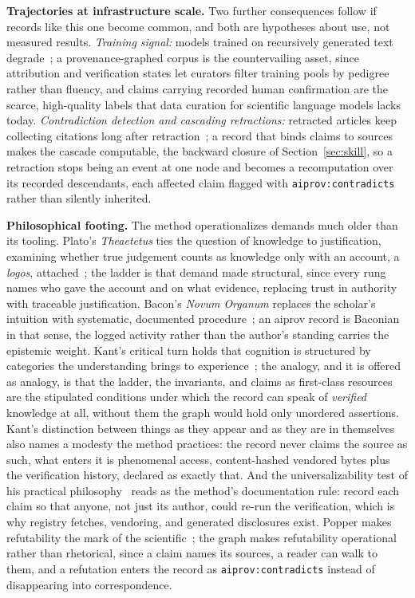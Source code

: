 \textbf{Trajectories at infrastructure scale.} Two further consequences follow if
records like this one become common, and both are hypotheses about
use, not measured results. \emph{Training signal:} models trained on
recursively generated text degrade~\cite{model-collapse2024}; a
provenance-graphed corpus is the countervailing asset, since
attribution and verification states let curators filter training
pools by pedigree rather than fluency, and claims carrying recorded
human confirmation are the scarce, high-quality labels
that data curation for scientific language models lacks today.
\emph{Contradiction detection and cascading retractions:} retracted
articles keep collecting citations long after
retraction~\cite{retracted-citations2022}; a record that binds
claims to sources makes the cascade computable, the backward closure
of Section~\ref{sec:skill}, so a retraction stops being an event at
one node and becomes a recomputation over its recorded descendants,
each affected claim flagged with \texttt{aiprov:contradicts} rather
than silently inherited.

\textbf{Philosophical footing.} The method operationalizes demands
much older than its tooling. Plato's \emph{Theaetetus} ties the
question of knowledge to justification, examining whether true
judgement counts as knowledge only with an account, a \emph{logos},
attached~\cite{plato-theaetetus}; the ladder is that demand made
structural, since every rung names who gave the account and on what
evidence, replacing trust in authority with traceable justification.
Bacon's \emph{Novum Organum} replaces the scholar's intuition with
systematic, documented procedure~\cite{bacon1620}; an aiprov record
is Baconian in that sense, the logged activity rather than
the author's standing carries the epistemic weight. Kant's critical
turn holds that cognition is structured by categories the
understanding brings to experience~\cite{kant-krv}; the analogy, and
it is offered as analogy, is that the ladder, the invariants, and
claims as first-class resources are the stipulated conditions under
which the record can speak of \emph{verified} knowledge at all,
without them the graph would hold only unordered assertions. Kant's
distinction between things as they appear and as they are in
themselves also names a modesty the method practices: the record
never claims the source as such, what enters it is phenomenal
access, content-hashed vendored bytes plus the verification history,
declared as exactly that. And the universalizability test of his
practical philosophy~\cite{kant-groundwork} reads as the method's
documentation rule: record each claim so that anyone, not just its
author, could re-run the verification, which is why registry
fetches, vendoring, and generated disclosures exist. Popper makes
refutability the mark of the scientific~\cite{popper1959}; the graph
makes refutability operational rather than rhetorical, since a claim
names its sources, a reader can walk to them, and a refutation
enters the record as \texttt{aiprov:contradicts} instead of
disappearing into correspondence.

